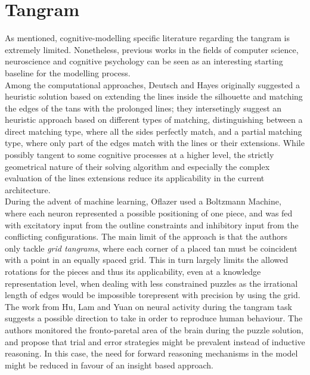 \documentclass[a4paper,singleside,12pt]{report} %
\begin{document}
	\section{Tangram}
	As mentioned, cognitive-modelling specific literature regarding the tangram is extremely
	limited. Nonetheless, previous works in the fields of computer science, neuroscience and cognitive psychology
	can be seen as an interesting starting baseline for the modelling process. \\Among the
	computational approaches, Deutsch and Hayes \cite{heuristic} originally suggested a heuristic
	solution based on extending the lines inside the silhouette and matching the edges of the tans
	with the prolonged lines; they intersetingly suggest an heuristic approach based on different
	types of matching, distinguishing between a direct matching type, where all the sides perfectly
	match, and a partial matching type, where only part of the edges match with the lines or their
	extensions. While possibly tangent to some cognitive processes at a higher level, the strictly
	geometrical nature of their solving algorithm and especially the complex evaluation of the lines
	extensions reduce its applicability in the current architecture.\\
	During the advent of machine learning, Oflazer \cite{Oflazer1993SolvingTP} used a Boltzmann
	Machine, where each neuron represented a possible positioning of one piece, and was fed with
	excitatory input from the outline constraints and inhibitory input from the conflicting
	configurations. The main limit of the approach is that the authors only tackle \textit{grid
	tangrams}, where each corner of a placed tan must be coincident with a point in an equally
	spaced grid. This in turn largely limits the allowed rotations for the pieces and thus its
	applicability, even at a knowledge representation level, when dealing with less constrained
	puzzles as the irrational length of edges would be impossible torepresent with precision by using
	the grid. \\
	The work from Hu, Lam and Yuan \cite{Hu2019EffectiveCO} on neural activity during the tangram
	task suggests a possible direction to take in order to reproduce human behaviour. The authors
	monitored the fronto-paretal area of the brain during the puzzle solution, and propose that trial and error
	strategies might be prevalent instead of inductive reasoning. In this case, the need for
	forward reasoning mechanisms in the model might be reduced in favour of an insight based
	approach. 
	
\end{document}
